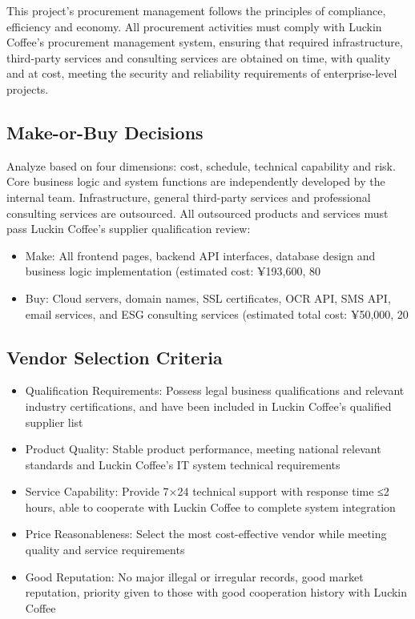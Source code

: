 \documentclass[12pt,a4paper]{article}
\begin{document}
This project's procurement management follows the principles of compliance, efficiency and economy. All procurement activities must comply with Luckin Coffee's procurement management system, ensuring that required infrastructure, third-party services and consulting services are obtained on time, with quality and at cost, meeting the security and reliability requirements of enterprise-level projects.

\subsection{Make-or-Buy Decisions}
Analyze based on four dimensions: cost, schedule, technical capability and risk. Core business logic and system functions are independently developed by the internal team. Infrastructure, general third-party services and professional consulting services are outsourced. All outsourced products and services must pass Luckin Coffee's supplier qualification review:
\begin{itemize}
  \item Make: All frontend pages, backend API interfaces, database design and business logic implementation (estimated cost: ¥193,600, 80%
  \item Buy: Cloud servers, domain names, SSL certificates, OCR API, SMS API, email services, and ESG consulting services (estimated total cost: ¥50,000, 20%
\end{itemize}

\subsection{Vendor Selection Criteria}
\begin{itemize}
  \item Qualification Requirements: Possess legal business qualifications and relevant industry certifications, and have been included in Luckin Coffee's qualified supplier list
  \item Product Quality: Stable product performance, meeting national relevant standards and Luckin Coffee's IT system technical requirements
  \item Service Capability: Provide 7×24 technical support with response time ≤2 hours, able to cooperate with Luckin Coffee to complete system integration
  \item Price Reasonableness: Select the most cost-effective vendor while meeting quality and service requirements
  \item Good Reputation: No major illegal or irregular records, good market reputation, priority given to those with good cooperation history with Luckin Coffee
\end{itemize}
\end{document}
